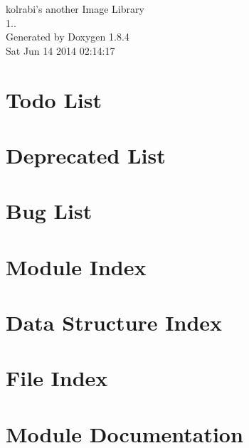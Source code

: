 \documentclass[twoside]{book}
\newcommand{\clearemptydoublepage}{%
  \newpage{\pagestyle{empty}\cleardoublepage}%
}
\begin{document}
\hypersetup{pageanchor=false}
\begin{titlepage}
\vspace*{7cm}
\begin{center}%
{\Large kolrabi's another Image Library \\[1ex]\large 1.. }\\
\vspace*{1cm}
{\large Generated by Doxygen 1.8.4}\\
\vspace*{0.5cm}
{\small Sat Jun 14 2014 02:14:17}\\
\end{center}
\end{titlepage}
\clearemptydoublepage
\tableofcontents
\clearemptydoublepage
{}
\hypersetup{pageanchor=true}

\chapter{Todo List}
\label{todo}
\hypertarget{todo}{}

\chapter{Deprecated List}
\label{deprecated}
\hypertarget{deprecated}{}

\chapter{Bug List}
\label{bug}
\hypertarget{bug}{}

\chapter{Module Index}

\chapter{Data Structure Index}

\chapter{File Index}

\chapter{Module Documentation}















\end{document}
